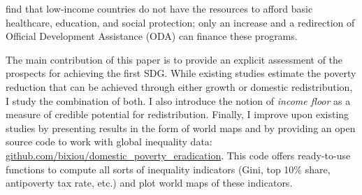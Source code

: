 \cite{manuel_financing_2018} find that low-income countries do not have the resources to afford basic healthcare, education, and social protection; only an increase and a redirection of Official Development Assistance (ODA) can finance these programs. 

The main contribution of this paper is to provide an explicit assessment of the prospects for achieving the first SDG. While existing studies estimate the poverty reduction that can be achieved through either growth or domestic redistribution, I study the combination of both. I also introduce the notion of \textit{income floor} as a measure of credible potential for redistribution. Finally, I improve upon existing studies by presenting results in the form of world maps and by providing an open source code to work with global inequality data: \href{https://github.com/bixiou/domestic_poverty_eradication}{github.com/bixiou/domestic\_poverty\_eradication}. This code offers ready-to-use functions to compute all sorts of inequality indicators (Gini, top 10\% share, antipoverty tax rate, etc.) and plot world maps of these indicators.


